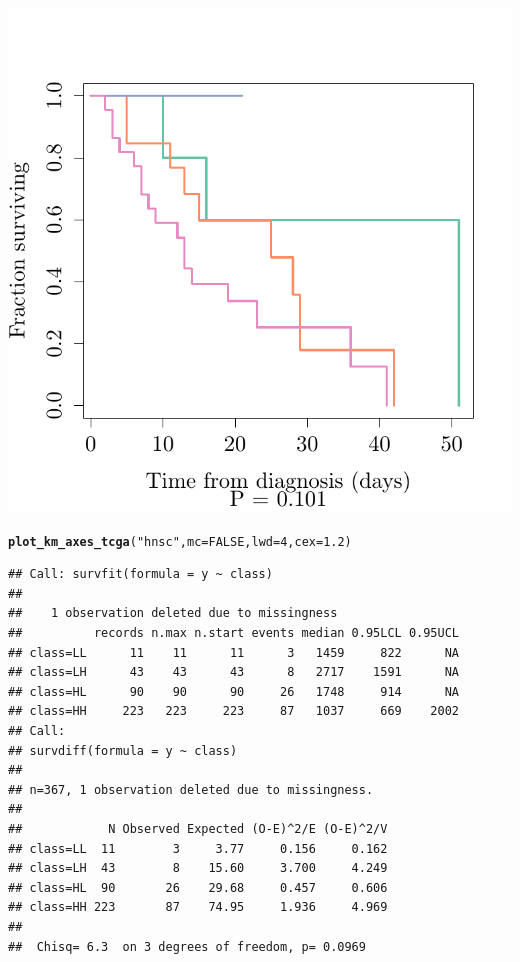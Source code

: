 \documentclass{article}\usepackage[]{graphicx}\usepackage[]{color}
\makeatletter
\def\maxwidth{ %
  \ifdim\Gin@nat@width>\linewidth
    \linewidth
  \else
    \Gin@nat@width
  \fi
}
\newcommand{\hlnum}[1]{\textcolor[rgb]{0.686,0.059,0.569}{#1}}%
\newcommand{\hlstr}[1]{\textcolor[rgb]{0.192,0.494,0.8}{#1}}%
\newcommand{\hlstd}[1]{\textcolor[rgb]{0.345,0.345,0.345}{#1}}%
\newcommand{\hlkwc}[1]{\textcolor[rgb]{0.333,0.667,0.333}{#1}}%
\newcommand{\hlkwd}[1]{\textcolor[rgb]{0.737,0.353,0.396}{\textbf{#1}}}%
\newenvironment{kframe}{%
 \def\at@end@of@kframe{}%
 \ifinner\ifhmode%
  \def\at@end@of@kframe{\end{minipage}}%
  \begin{minipage}{\columnwidth}%
 \fi\fi%
 \def\FrameCommand##1{\hskip\@totalleftmargin \hskip-\fboxsep
 \colorbox{shadecolor}{##1}\hskip-\fboxsep
     \hskip-\linewidth \hskip-\@totalleftmargin \hskip\columnwidth}%
 \MakeFramed {\advance\hsize-\width
   \@totalleftmargin\z@ \linewidth\hsize
   \@setminipage}}%
 {\par\unskip\endMakeFramed%
 \at@end@of@kframe}
\newenvironment{knitrout}{}{} %
\makeatother
\begin{document}
\begin{knitrout}
{}




{\centering \includegraphics[width=\maxwidth]{figure/km-curves-6} 

}


\begin{kframe}\begin{alltt}
\hlkwd{plot_km_axes_tcga}\hlstd{(}\hlstr{"hnsc"}\hlstd{,} \hlkwc{mc} \hlstd{=} \hlnum{FALSE}\hlstd{,} \hlkwc{lwd} \hlstd{=} \hlnum{4}\hlstd{,} \hlkwc{cex} \hlstd{=} \hlnum{1.2}\hlstd{)}
\end{alltt}
\begin{verbatim}
## Call: survfit(formula = y ~ class)
## 
##    1 observation deleted due to missingness 
##          records n.max n.start events median 0.95LCL 0.95UCL
## class=LL      11    11      11      3   1459     822      NA
## class=LH      43    43      43      8   2717    1591      NA
## class=HL      90    90      90     26   1748     914      NA
## class=HH     223   223     223     87   1037     669    2002
## Call:
## survdiff(formula = y ~ class)
## 
## n=367, 1 observation deleted due to missingness.
## 
##            N Observed Expected (O-E)^2/E (O-E)^2/V
## class=LL  11        3     3.77     0.156     0.162
## class=LH  43        8    15.60     3.700     4.249
## class=HL  90       26    29.68     0.457     0.606
## class=HH 223       87    74.95     1.936     4.969
## 
##  Chisq= 6.3  on 3 degrees of freedom, p= 0.0969
\end{verbatim}
\end{kframe}


\end{knitrout}
\end{document}
